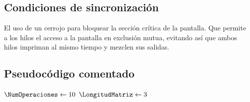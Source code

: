 \documentclass[a4paper,12pt,titlepage,oneside]{article}
\begin{document}
    \subsection{Condiciones de sincronización}
    El uso de un cerrojo para bloquear la sección crítica de la pantalla. Que permite a los hilos el acceso
    a la pantalla en exclusión mutua, evitando así que ambos hilos impriman al mismo tiempo y mezclen sus salidas.
    \subsection{Pseudocódigo comentado}
        \begin{algorithm}[H]
            \DontPrintSemicolon



            \SetAlgoLined
            \BlankLine 
            $\NumOperaciones \leftarrow 10$\;
            $\LongitudMatriz \leftarrow 3$\;
            \BlankLine


        \end{algorithm}
\end{document}
